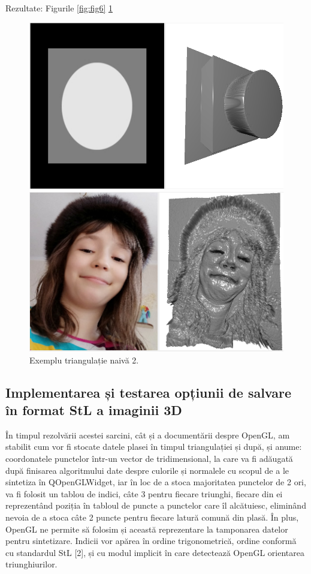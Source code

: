 \documentclass[12pt]{article}
\begin{document}
Rezultate: Figurile \ref{fig:fig6} \ref{fig:fig7}

\begin{figure}[!htb]
	\begin{minipage}{0.48\textwidth}
		\centering
		\includegraphics[width=.7\linewidth]{ExempluNaiva1.png}
		\caption{Exemplu triangulație naivă 1.}\label{fig:fig6}
	\end{minipage}
	\begin{minipage}{0.48\textwidth}
		\centering
		\includegraphics[width=.7\linewidth]{ExempluNaiva2.png}
		\caption{Exemplu triangulație naivă 2.}\label{fig:fig7}
	\end{minipage}\hfill
\end{figure}

\subsection{Implementarea și testarea opțiunii de salvare în format StL a imaginii 3D}

În timpul rezolvării acestei sarcini, cât și a documentării despre OpenGL, am stabilit cum vor fi stocate datele plasei în timpul triangulației și după, și anume: coordonatele punctelor într-un vector de tridimensional, la care va fi adăugată după finisarea algoritmului date despre culorile și normalele cu scopul de a le sintetiza în QOpenGLWidget, iar în loc de a stoca majoritatea punctelor de 2 ori, va fi folosit un tablou de indici, câte 3 pentru fiecare triunghi, fiecare din ei reprezentând poziția în tabloul de puncte a punctelor care îl alcătuiesc, eliminând nevoia de a stoca câte 2 puncte pentru fiecare latură comună din plasă. În plus, OpenGL ne permite să folosim și această reprezentare la tamponarea datelor pentru sintetizare. Indicii vor apărea în ordine trigonometrică, ordine conformă cu standardul StL [2], și cu modul implicit în care detectează OpenGL orientarea triunghiurilor.
\end{document}
